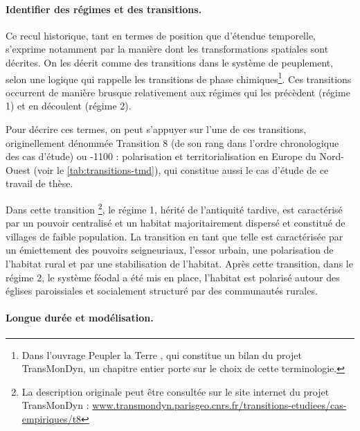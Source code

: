 \paragraph{Identifier des \og régimes\fg{} et des \og transitions\fg{}.}

Ce recul historique, tant en termes de position que d'étendue temporelle, s'exprime notamment par la manière dont les transformations spatiales sont décrites.
On les décrit comme des \og transitions\fg{} dans le système de peuplement, selon une logique qui rappelle les transitions de phase chimiques\footnote{
	Dans l'ouvrage \og Peupler la Terre\fg{} \autocite{sanders2018peupler}, qui constitue un bilan du projet TransMonDyn, un chapitre entier \autocite{pumain_convergences_2017} porte sur le choix de cette terminologie.
}.
Ces transitions occurrent de manière brusque relativement aux \og régimes\fg{} qui les précèdent (\og régime 1\fg{}) et en découlent (\og régime 2\fg{}).

Pour décrire ces termes, on peut s'appuyer sur l'une de ces transitions, originellement dénommée \og Transition 8\fg{} (de son rang dans l'ordre chronologique des cas d'étude) ou -1100 :
	polarisation et territorialisation en Europe du Nord-Ouest\fg{} (voir le \cref{tab:transitions-tmd}), qui constitue aussi le cas d'étude de ce travail de thèse.

Dans cette transition \footnote{
	La description originale peut être consultée sur le site internet du projet \mbox{TransMonDyn} : \href{http://www.transmondyn.parisgeo.cnrs.fr/transitions-etudiees/cas-empiriques/t8}{www.transmondyn.parisgeo.cnrs.fr/transitions-etudiees/cas-empiriques/t8}
}, le régime 1, hérité de l'antiquité tardive, est caractérisé par un pouvoir centralisé et un habitat majoritairement dispersé et constitué de villages de faible population.
La transition en tant que telle est caractérisée par un émiettement des pouvoirs seigneuriaux, l'essor urbain, une polarisation de l'habitat rural et par une stabilisation de l'habitat.
Après cette transition, dans le régime 2, le système féodal a été mis en place, l'habitat est polarisé autour des églises paroissiales et socialement structuré par des communautés rurales.

\paragraph{Longue durée et modélisation.}

